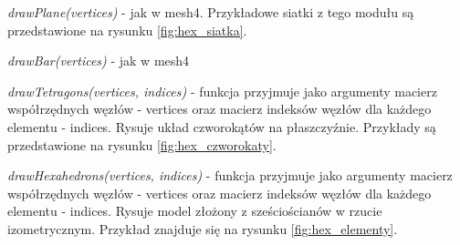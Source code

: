 \textit{drawPlane(vertices)} - jak w mesh4. Przykładowe siatki z tego modułu są przedstawione na rysunku \ref{fig:hex_siatka}.

\textit{drawBar(vertices)} - jak w mesh4

\textit{drawTetragons(vertices, indices)} - funkcja przyjmuje jako argumenty macierz współrzędnych węzłów - vertices oraz macierz indeksów węzłów dla każdego elementu - indices. Rysuje układ czworokątów na płaszczyźnie. Przykłady są przedstawione na rysunku \ref{fig:hex_czworokaty}.

\textit{drawHexahedrons(vertices, indices)} - funkcja przyjmuje jako argumenty macierz współrzędnych węzłów - vertices oraz macierz indeksów węzłów dla każdego elementu - indices. Rysuje model złożony z sześciościanów w rzucie izometrycznym. Przykład znajduje się na rysunku \ref{fig:hex_elementy}.

